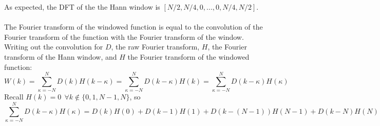 \documentclass{article}
\newcommand{\<}[1]{\left\langle #1 \right\rangle }
\begin{document}
As expected, the DFT of the the Hann window is $[N/2, N/4, 0, ..., 0, N/4, N/2]$.\\
\\
The Fourier transform of the windowed function is equal to the convolution of the Fourier transform of the function with the Fourier transform of the window. Writing out the convolution for $D$, the raw Fourier transform, $H$, the Fourier transform of the Hann window, and $H$ the Fourier transform of the windowed function:
\[W(k) = \sum_{\kappa=-N}^N D(k)H(k - \kappa) = \sum_{\kappa=-N}^N D(k-\kappa)H(k) = \sum_{\kappa=-N}^N D(k-\kappa)H(\kappa)\]
Recall $H(k) = 0 \ \ \forall k \notin \{0, 1, N-1, N\}$, so
\[\sum_{\kappa=-N}^N D(k-\kappa)H(\kappa) = D(k)H(0) + D(k-1)H(1) + D(k-(N-1))H(N-1) + D(k-N)H(N) \]





	
\end{document}
